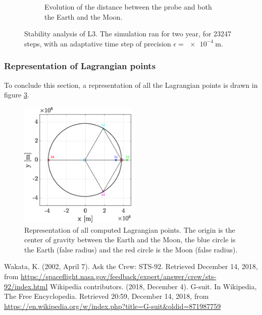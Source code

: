 \documentclass[a4paper,12pt,twoside]{article}
\begin{document}
\begin{figure}[h]
\begin{subfigure}[t]{0.4\textwidth}
    \caption{Evolution of the distance between the probe and both the Earth and the Moon.}
    \label{fig:7b_L3_dist}
  \end{subfigure}
  \caption{Stability analysis of L3. The simulation ran for two year, for \num{23247} steps, with an adaptative time step of precision $\epsilon = \SI{e-4}{\m}$.}
  \label{fig:7b_L3}
\end{figure}


\subsubsection{Representation of Lagrangian points}
To conclude this section, a representation of all the Lagrangian points is drawn in figure \ref{fig:7b_allLPoints}.


\begin{figure}[h]
  \centering
  \includegraphics[width=0.5\textwidth]{graphs/ex7b_allLPoints.eps}
  \caption{Representation of all computed Lagrangian points. The origin is the center of gravity between the Earth and the Moon, the blue circle is the Earth (false radius) and the red circle is the Moon (false radius).}
  \label{fig:7b_allLPoints}
\end{figure}






\begin{thebibliography}{99}
   Wakata, K. (2002, April 7). Ask the Crew: STS-92. Retrieved December 14, 2018, from \url{https://spaceflight.nasa.gov/feedback/expert/answer/crew/sts-92/index.html}
   Wikipedia contributors. (2018, December 4). G-suit. In Wikipedia, The Free Encyclopedia. Retrieved 20:59, December 14, 2018, from \url{https://en.wikipedia.org/w/index.php?title=G-suit&oldid=871987759}
\end{thebibliography}
\end{document}
